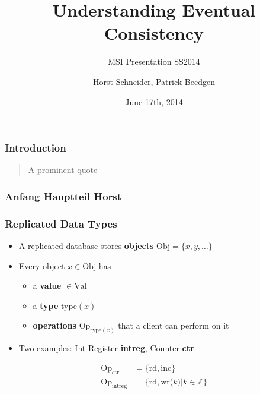 \documentclass[11pt]{beamer}
\author{Horst Schneider, Patrick Beedgen}
\title{Understanding Eventual Consistency}
\subtitle{MSI Presentation SS2014}
\institute{Hochschule Mannheim}
\date{June 17th, 2014}
\begin{document}
\begin{frame}
\titlepage
\end{frame}


\begin{frame}
\frametitle{Introduction}
\begin{quotation}
\glqq A prominent quote\grqq
\end{quotation}
\end{frame}

\begin{frame}
\frametitle{Anfang Hauptteil Horst}
\end{frame}

\begin{frame}
\frametitle{Replicated Data Types}
\begin{itemize}
\item A replicated database stores \textbf{objects} \(\mathrm{Obj} = \{x,y,\dots\} \)
\pause
\item Every object \(x \in \mathrm{Obj}\) has
\begin{itemize}
\item a \textbf{value} \(\in \mathrm{Val}\)
\pause
\item a \textbf{type} type\((x)\)
\pause
\item  \textbf{operations} \(\mathrm{Op}_{\mathrm{type}(x)}\) that a client can perform on it
\pause
\end{itemize}
\item Two examples: Int Register \textbf{intreg}, Counter \textbf{ctr}
\end{itemize}

\begin{align*}
\mathrm{Op}_\mathrm{ctr} &= \mathrm{\{rd, inc\}} \\
\mathrm{Op}_\mathrm{intreg} &= \mathrm{\{rd, wr(}k \mathrm{)|} k \in \mathbb{Z} \mathrm{\}}
\end{align*}
\end{frame}
\end{document}

